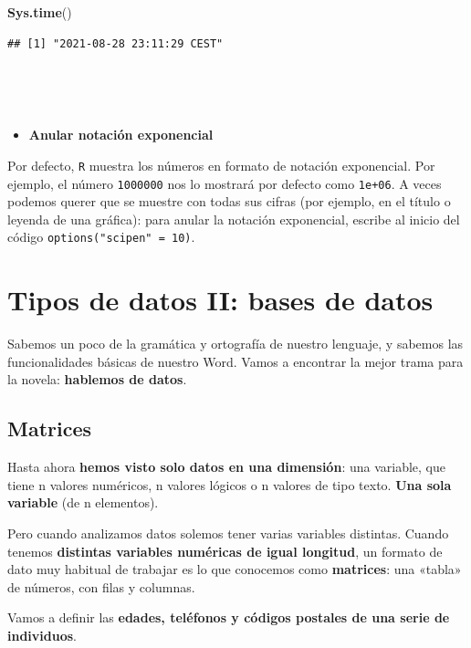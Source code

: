 \documentclass[11pt,]{book}
\newenvironment{Shaded}{\begin{snugshade}}{\end{snugshade}}
\newcommand{\KeywordTok}[1]{\textcolor[rgb]{0.27,0.27,0.27}{\textbf{#1}}}
\newcommand{\NormalTok}[1]{#1}
\providecommand{\tightlist}{%
  \setlength{\itemsep}{0pt}\setlength{\parskip}{0pt}}
\begin{document}
\begin{Shaded}
\begin{Highlighting}[]
\KeywordTok{Sys.time}\NormalTok{()}
\end{Highlighting}
\end{Shaded}

\begin{verbatim}
## [1] "2021-08-28 23:11:29 CEST"
\end{verbatim}

~

~

\begin{itemize}
\tightlist
\item
  \textbf{Anular notación exponencial}
\end{itemize}

Por defecto, \texttt{R} muestra los números en formato de notación exponencial. Por ejemplo, el número \texttt{1000000} nos lo mostrará por defecto como \texttt{1e+06}. A veces podemos querer que se muestre con todas sus cifras (por ejemplo, en el título o leyenda de una gráfica): para anular la notación exponencial, escribe al inicio del código \texttt{options("scipen"\ =\ 10)}.

\hypertarget{datos}{%
\chapter{Tipos de datos II: bases de datos}\label{datos}}

Sabemos un poco de la gramática y ortografía de nuestro lenguaje, y sabemos las funcionalidades básicas de nuestro Word. Vamos a encontrar la mejor trama para la novela: \textbf{hablemos de datos}.

\hypertarget{matrices}{%
\section{Matrices}\label{matrices}}

Hasta ahora \textbf{hemos visto solo datos en una dimensión}: una variable, que tiene n valores numéricos, n valores lógicos o n valores de tipo texto. \textbf{Una sola variable} (de n elementos).

Pero cuando analizamos datos solemos tener varias variables distintas. Cuando tenemos \textbf{distintas variables numéricas de igual longitud}, un formato de dato muy habitual de trabajar es lo que conocemos como \textbf{matrices}: una «tabla» de números, con filas y columnas.

Vamos a definir las \textbf{edades, teléfonos y códigos postales de una serie de individuos}.
\end{document}
